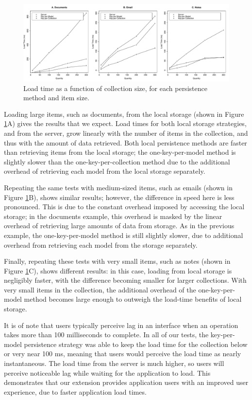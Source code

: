 \documentclass[12pt]{article}
\begin{document}
\begin{figure}[th]
  \centering
  \includegraphics[width=\textwidth]{lines.pdf}
  \caption{Load time as a function of collection size, for each persistence
  method and item size.}
  \label{fig:line}
\end{figure}

Loading large items, such as documents, from the local storage (shown in Figure
\ref{fig:line}A) gives the results that we expect. Load times for both
local storage strategies, and from the server, grow linearly with the number of
items in the collection, and thus with the amount of data retrieved. Both local
persistence methods are faster than retrieving items from the local storage;
the one-key-per-model method is slightly slower than the one-key-per-collection
method due to the additional overhead of retrieving each model from the local
storage separately.

Repeating the same tests with medium-sized items, such as emails (shown in
Figure \ref{fig:line}B), shows similar results; however, the difference in
speed here is less pronounced. This is due to the constant overhead imposed by
accessing the local storage; in the documents example, this overhead is masked
by the linear overhead of retrieving large amounts of data from storage. As in
the previous example, the one-key-per-model method is still slightly slower,
due to additional overhead from retrieving each model from the storage
separately.

Finally, repeating these tests with very small items, such as notes (shown in
Figure \ref{fig:line}C), shows different results: in this case, loading from
local storage is negligibly faster, with the difference becoming smaller for
larger collections. With very small items in the collection, the additional
overhead of the one-key-per-model method becomes large enough to outweigh the
load-time benefits of local storage.

It is of note that users typically perceive lag in an interface when an
operation takes more than 100 milliseconds to complete. In all of our tests,
the key-per-model persistence strategy was able to keep the load time for the
collection below or very near 100 ms, meaning that users would perceive the
load time as nearly instantaneous. The load time from the server is much
higher, so users will perceive noticeable lag while waiting for the application
to load. This demonstrates that our extension provides application users with
an improved user experience, due to faster application load times.
\end{document}
